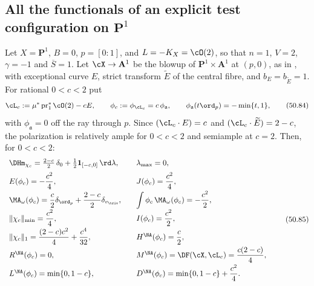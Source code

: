 \subsection{All the functionals of an explicit test configuration on
\texorpdfstring{$\mathbf P^1$}{P1}}
\label{sec:ch50-ex-p1}

\begin{example}
\label{ex:ch50-p1-dnc}
Let $X=\mathbf P^1$, $B=0$, $p=[0:1]$, and
$L=-K_X=\cO(2)$, so that $n=1$, $V=2$, $\gamma=-1$ and
$\overline S=1$.  Let $\cX\to\mathbf A^1$ be the blowup of
$\mathbf P^1\times\mathbf A^1$ at $(p,0)$, as in
, with exceptional curve $E$, strict transform
$\widetilde E$ of the central fibre, and $b_E=b_{\widetilde E}=1$.
For rational $0<c<2$ put
\[
 \cL_c:=\mu^*\operatorname{pr}_1^*\cO(2)-cE,
 \qquad
 \phi_c:=\phi_{\cL_c}=c\,\phi_{\mathfrak a},
 \qquad
 \phi_{\mathfrak a}(t\ord_p)=-\min\{t,1\},
\tag{50.84}\label{eq:ch50-p1-dnc-metric}
\]
with $\phi_{\mathfrak a}=0$ off the ray through $p$.  Since
$(\cL_c\cdot E)=c$ and $(\cL_c\cdot\widetilde E)=2-c$, the polarization
is relatively ample for $0<c<2$ and semiample at $c=2$.  Then, for
$0<c<2$:
\[
 \begin{array}{ll}
 \DHm_{\chi_c}=\tfrac{2-c}{2}\,\delta_0
   +\tfrac12\mathbf 1_{[-c,0]}\,\rd\lambda,
 &\quad \lambda_{\max}=0,\\[2mm]
 E(\phi_c)=-\dfrac{c^2}{4},
 &\quad J(\phi_c)=\dfrac{c^2}4,\\[2mm]
 \MA_\omega(\phi_c)=\dfrac c2\delta_{\ord_p}
        +\dfrac{2-c}2\delta_{v_{\triv}},
 &\quad \displaystyle\int\phi_c\,\MA_\omega(\phi_c)=-\dfrac{c^2}2,\\[2mm]
 \|\chi_c\|_{\min}=\dfrac{c^2}4,
 &\quad I(\phi_c)=\dfrac{c^2}2,\\[2mm]
 \|\chi_c\|_1=\dfrac{(2-c)c^2}4+\dfrac{c^4}{32},
 &\quad H^{\NA}(\phi_c)=\dfrac c2,\\[2mm]
 R^{\NA}(\phi_c)=0,
 &\quad M^{\NA}(\phi_c)=\DF(\cX,\cL_c)=\dfrac{c(2-c)}4,\\[2mm]
 L^{\NA}(\phi_c)=\min\{0,1-c\},
 &\quad D^{\NA}(\phi_c)=\min\{0,1-c\}+\dfrac{c^2}4.
 \end{array}
\tag{50.85}\label{eq:ch50-p1-dnc-table}
\]
\end{example}

